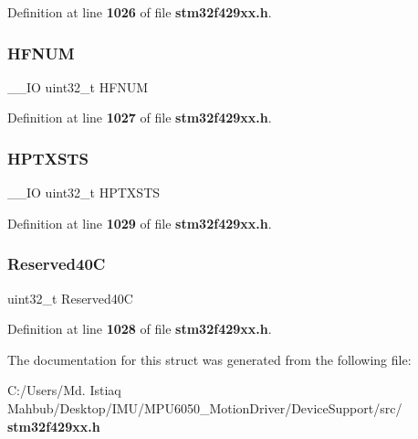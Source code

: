 Definition at line \textbf{ 1026} of file \textbf{ stm32f429xx.\+h}.

\mbox{\label{structUSB__OTG__HostTypeDef_a6a141fc0dab9ee8930465a2da604420f}} 
\subsubsection{H\+F\+N\+UM}
{\footnotesize\ttfamily \+\_\+\+\_\+\+IO uint32\+\_\+t H\+F\+N\+UM}



Definition at line \textbf{ 1027} of file \textbf{ stm32f429xx.\+h}.

\mbox{\label{structUSB__OTG__HostTypeDef_a3903a00940c32a9f09889e08881e7a6a}} 
\subsubsection{H\+P\+T\+X\+S\+TS}
{\footnotesize\ttfamily \+\_\+\+\_\+\+IO uint32\+\_\+t H\+P\+T\+X\+S\+TS}



Definition at line \textbf{ 1029} of file \textbf{ stm32f429xx.\+h}.

\mbox{\label{structUSB__OTG__HostTypeDef_af66e42cdb83dc2eb156dfbbf42890f79}} 
\subsubsection{Reserved40C}
{\footnotesize\ttfamily uint32\+\_\+t Reserved40C}



Definition at line \textbf{ 1028} of file \textbf{ stm32f429xx.\+h}.



The documentation for this struct was generated from the following file\+:\begin{DoxyCompactItemize}
\item 
C\+:/\+Users/\+Md. Istiaq Mahbub/\+Desktop/\+I\+M\+U/\+M\+P\+U6050\+\_\+\+Motion\+Driver/\+Device\+Support/src/\textbf{ stm32f429xx.\+h}\end{DoxyCompactItemize}
